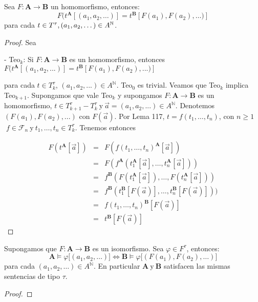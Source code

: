   \begin{lemma} \label{lemma_48}
    \PN Sea $F: \mathbf{A} \rightarrow \mathbf{B}$ un homomorfismo, entonces:
    \[
      F(t^{\mathbf{A}}[(a_{1}, a_{2}, \dotsc)] = t^{\mathbf{B}}[F(a_{1}), F(a_{2}), \dotsc)]
    \]
    \PN para cada $t \in T^{\tau}, (a_{1}, a_{2}, \dotsc) \in A^{\mathbb{N}}$.
  \end{lemma}
  \begin{proof}
    Sea

    - Teo$_{k}$: Si $F:\mathbf{A} \rightarrow \mathbf{B}$ es un homomorfismo, entonces
    $\displaystyle F(t^{\mathbf{A}}[(a_{1},a_{2},...)]=t^{\mathbf{B}}[F(a_{1}),F(a_{2}),...)] $

    para cada $t\in T_{k}^{\tau }$, $(a_{1},a_{2},...)\in A^{\mathbb{N}}$.
    Teo$_{0}$ es trivial. Veamos que Teo$_{k}$ implica Teo$_{k+1}$. Supongamos que vale Teo$_{k}$ y supongamos $F:\mathbf{A} \rightarrow \mathbf{B}$ es un homomorfismo, $t\in T_{k+1}^{\tau }-T_{k}^{\tau } \ \text{y} \ \vec{a} = (a_{1},a_{2},...)\in A^{\mathbb{N}}$. Denotemos $(F(a_{1}),F(a_{2}),...)$ con $F(\vec{a})$. Por Lema 117, $t=f(t_{1}, \dotsc, t_{n})$, con $n\geq 1 $$\;f\in \mathcal{F}_{n} \ \text{y} \ t_{1}, \dotsc, t_{n}\in T_{k}^{\tau }$. Tenemos entonces

    \[
      \begin{array}{ccl}
        F(t^{\mathbf{A}}[\vec{a}]) &=& F(f(t_{1}, \dotsc, t_{n})^{\mathbf{A}}[\vec{a}]) \\
        &=& F(f^{\mathbf{A}}(t_{1}^{\mathbf{A}}[\vec{a}], \dotsc, t_{n}^{\mathbf{A}}[ \vec{a}])) \\
        &=& f^{\mathbf{B}}(F(t_{1}^{\mathbf{A}}[\vec{a}]), \dotsc, F(t_{n}^{\mathbf{A}}[ \vec{a}])) \\
        &=& f^{\mathbf{B}}(t_{1}^{\mathbf{B}}[F(\vec{a})], \dotsc, t_{n}^{\mathbf{B}}[F( \vec{a})])) \\
        &=& f(t_{1}, \dotsc, t_{n})^{\mathbf{B}}[F(\vec{a})] \\
        &=& t^{\mathbf{B}}[F(\vec{a})]
      \end{array}
    \]
  \end{proof}

  \begin{lemma} \label{lemma_49}
    \PN Supongamos que $F: \mathbf{A} \rightarrow \mathbf{B}$ es un isomorfismo. Sea $\varphi \in F^{\tau}$, entonces:
    \[
      \mathbf{A} \models \varphi \lbrack (a_{1}, a_{2}, \dotsc)] \Leftrightarrow \mathbf{B} \models \varphi \lbrack
      (F(a_{1}), F(a_{2}), \dotsc)]
    \]
    \PN para cada $(a_{1}, a_{2}, \dotsc) \in A^{\mathbb{N}}$. En particular $\mathbf{A} \ \text{y} \ \mathbf{B}$ satisfacen las
    mismas sentencias de tipo $\tau$.
  \end{lemma}
  \begin{proof}
  \end{proof}

